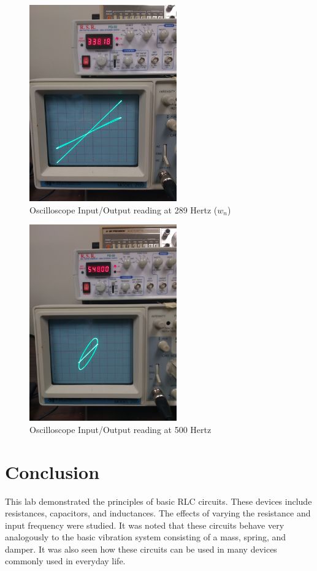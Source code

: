 \documentclass[12pt]{article}
\begin{document}
\begin{figure}[h!] %
   \centering
   \includegraphics[width=2.5in]{ab_at_nat_freq.jpg} 
   \caption{Oscilloscope Input/Output reading at 289 Hertz ($w_{n}$)}
   \label{fig:example}
\end{figure}

\newpage

\begin{figure}[h] %
   \centering
   \includegraphics[width=2.5in]{ab_above_nat_freq.jpg} 
   \caption{Oscilloscope Input/Output reading at 500 Hertz}
   \label{fig:example}
\end{figure}
\bigskip



\section*{\fontsize{12}{12}\selectfont \large Conclusion}
This lab demonstrated the principles of basic RLC circuits. These devices include resistances, capacitors, and inductances. The effects of varying the resistance and input frequency were studied. It was noted that these circuits behave very analogously to the basic vibration system consisting of a mass, spring, and damper. It was also seen how these circuits can be used in many devices commonly used in everyday life.
\end{document}
